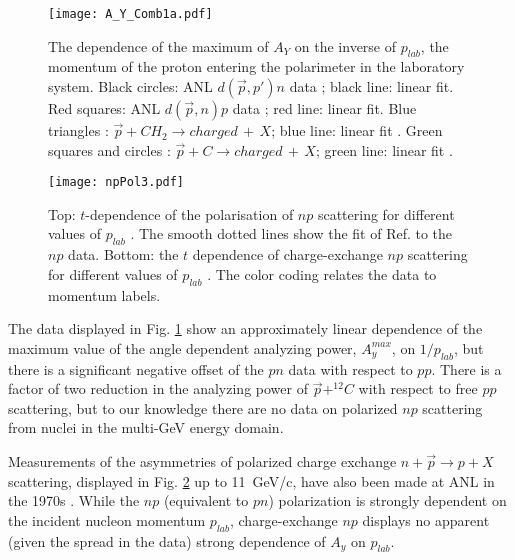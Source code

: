 \documentclass[epj]{svjour}
\begin{document}
\begin{figure}
\begin{centering}
\texttt{[image: A\_Y\_Comb1a.pdf]} 
\par\end{centering}
\caption{\label{fig:Dep-Ay1}The dependence of the maximum of $A_{Y}$ on the inverse of $p_{lab}$, the momentum of the proton entering the polarimeter in the laboratory system. 
Black circles: ANL $d(\vec{p},p')n$ data \cite{PhysRevLett.35.632,Kramer:1977pf};
black line: linear fit. Red squares: ANL $d(\vec{p},n)p$ data \cite{Cheung:1995ei,Alekseev:1999ag} ;
red line: linear fit. Blue triangles \cite{Azhgirey:2004yk}: $\vec{p}+ CH_{2} \to charged\,+\,X$;
blue line: linear fit \cite{Azhgirey:2004yk}. Green squares \cite{Cheung:1995ei}
and circles \cite{Alekseev:1999ag}: $\vec{p}+ C\to charged\,+\,X$;
green line: linear fit \cite{Azhgirey:2004yk}. }
\end{figure}

\begin{figure}[htb]
\begin{centering}
\texttt{[image: npPol3.pdf]}
\par\end{centering}
\caption{\label{fig:Dep-Ay}Top:  $t$-dependence of the
polarisation of $np$ scattering  for different values of $p_{lab}$ \cite{PhysRevLett.35.632,Kramer:1977pf}. The smooth
dotted lines show the fit of Ref. \cite{Ladygin:409018} to the $np$ data.
Bottom: the $t$ dependence of charge-exchange $np$
scattering for different values of $p_{lab}$ \cite{PhysRevLett.30.1183,Robrish:1970jw}. The color coding relates the data
to momentum labels. }
\end{figure}

The data displayed in Fig. \ref{fig:Dep-Ay1} show an approximately 
linear dependence of the maximum value of the angle dependent analyzing power, $A_{y}^{max}$, on $1/p_{lab}$, but there is
a significant negative offset of the $pn$ data with respect to $pp$. There is a factor of two reduction in the analyzing power of $\vec{p}+^{12}\!C$ with respect to free $pp$ scattering, but to our knowledge there
are no data on polarized $np$ scattering from nuclei in the multi-GeV
energy domain.

Measurements of the asymmetries of polarized charge exchange $n+\vec{p}\to p+X$
scattering, displayed in Fig. \ref{fig:Dep-Ay} up to 11~GeV/c,  have also been made at ANL in
the 1970s \cite{Robrish:1970jw,PhysRevLett.30.1183}.
While the $np$ (equivalent to $pn$) polarization is strongly dependent on the incident nucleon momentum $p_{lab}$, charge-exchange $np$ displays no apparent (given the spread in the data) strong dependence of $A_{y}$ on $p_{lab}$.
\end{document}
